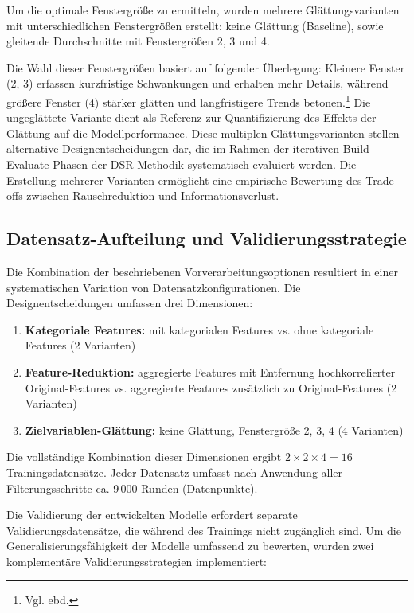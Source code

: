 Um die optimale Fenstergröße zu ermitteln, wurden mehrere Glättungsvarianten mit unterschiedlichen Fenstergrößen erstellt: keine Glättung (Baseline), sowie gleitende Durchschnitte mit Fenstergrößen 2, 3 und 4.

Die Wahl dieser Fenstergrößen basiert auf folgender Überlegung: Kleinere Fenster (2, 3) erfassen kurzfristige Schwankungen und erhalten mehr Details, während größere Fenster (4) stärker glätten und langfristigere Trends betonen.\footnote{Vgl. ebd.} Die ungeglättete Variante dient als Referenz zur Quantifizierung des Effekts der Glättung auf die Modellperformance.
Diese multiplen Glättungsvarianten stellen alternative Designentscheidungen dar, die im Rahmen der iterativen Build-Evaluate-Phasen der DSR-Methodik systematisch evaluiert werden. Die Erstellung mehrerer Varianten ermöglicht eine empirische Bewertung des Trade-offs zwischen Rauschreduktion und Informationsverlust.


\subsection{Datensatz-Aufteilung und Validierungsstrategie}

Die Kombination der beschriebenen Vorverarbeitungsoptionen resultiert in einer systematischen Variation von Datensatzkonfigurationen. Die Designentscheidungen umfassen drei Dimensionen:

\begin{enumerate}
  \item \textbf{Kategoriale Features:} mit kategorialen Features vs. ohne kategoriale Features (2 Varianten)
  \item \textbf{Feature-Reduktion:} aggregierte Features mit Entfernung hochkorrelierter Original-Features vs. aggregierte Features zusätzlich zu Original-Features (2 Varianten)
  \item \textbf{Zielvariablen-Glättung:} keine Glättung, Fenstergröße 2, 3, 4 (4 Varianten)
\end{enumerate}
Die vollständige Kombination dieser Dimensionen ergibt $2 \times 2 \times 4 = 16$ Trainingsdatensätze. Jeder Datensatz umfasst nach Anwendung aller Filterungsschritte ca. 9\,000 Runden (Datenpunkte).

Die Validierung der entwickelten Modelle erfordert separate Validierungsdatensätze, die während des Trainings nicht zugänglich sind. Um die Generalisierungsfähigkeit der Modelle umfassend zu bewerten, wurden zwei komplementäre Validierungsstrategien implementiert:

